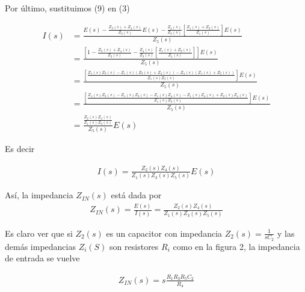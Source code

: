 \documentclass{article}
\begin{document}
Por último, sustituimos (9) en (3)

\begin{align}
	I(s) &= \frac{E(s) - \frac{Z_3(s) + Z_4(s)}{Z_3(s)}E(s) - \frac{Z_4(s)}{Z_3(s)} \left[ \frac{Z_1(s) + Z_2(s)}{Z_1(s)} \right] E(s) }{Z_5(s)} \nonumber \\
	&= \frac{ \left[ 1 - \frac{Z_3(s) + Z_4(s)}{Z_3(s)} - \frac{Z_4(s)}{Z_3(s)} \left[ \frac{Z_1(s) + Z_2(s)}{Z_1(s)}  \right] \right]E(s) }{Z_5(s)} \nonumber \\
	&= \frac{ \left[ \frac{ Z_1(s)Z_3(s) - Z_1(s)(Z_3(s) + Z_4(s)) - Z_4(s)(Z_1(s) + Z_2(s)) }{ Z_1(s) Z_3(s) } \right] E(s) }{Z_5(s)} \nonumber \\
	&= \frac{ \left[ \frac{ Z_1(s)Z_3(s) - Z_1(s)Z_3(s) - Z_1(s)Z_4(s) - Z_1(s)Z_4(s) + Z_2(s)Z_4(s) }{ Z_1(s) Z_3(s) } \right] E(s) }{Z_5(s)} \nonumber \\
	&= \frac{ \frac{Z_2(s)Z_4(s)}{Z_1(s)Z_3(s)} }{Z_5(s)} E(s) \nonumber
\end{align}

Es decir

\begin{align}
	I(s) = \frac{Z_2(s)Z_4(s)}{Z_1(s)Z_3(s)Z_5(s)}E(s)
\end{align}

Así, la impedancia $Z_{IN}(s)$ está dada por
\begin{align}
	Z_{IN}(s) = \frac{E(s)}{I(s)} = \frac{Z_2(s)Z_4(s)}{Z_1(s)Z_3(s)Z_5(s)}
\end{align}

Es claro ver que si $Z_2(s)$ es un capacitor con impedancia $Z_2(s) = \frac{1}{sC_2}$ y las demás impedancias $Z_i(S)$ son resistores $R_i$ como en la figura 2, la impedancia de entrada se vuelve

\begin{align}
	Z_{IN}(s) = s\frac{R_1R_3R_5C_2}{R_4}
\end{align}
\end{document}
